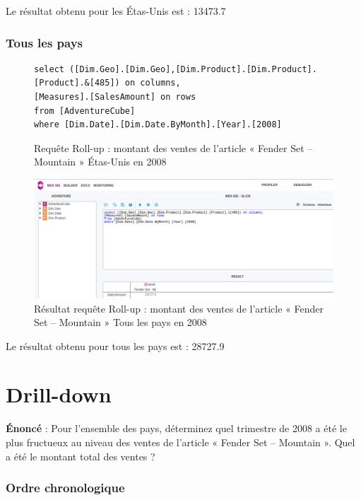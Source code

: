 Le résultat obtenu pour les Étas-Unis est : 13473.7

\subsubsection*{Tous les pays}

\begin{figure}[H]
\centering
\begin{lstlisting}
select ([Dim.Geo].[Dim.Geo],[Dim.Product].[Dim.Product].[Product].&[485]) on columns,
[Measures].[SalesAmount] on rows
from [AdventureCube]
where [Dim.Date].[Dim.Date.ByMonth].[Year].[2008]
\end{lstlisting}
\caption{Requête Roll-up : montant des ventes de l'article « Fender Set – Mountain » Étas-Unis en 2008}
\label{lst:reqRollUpUS}
\end{figure}

\begin{figure}[H]
    \centering
    \includegraphics[width=1\linewidth, fbox]{img/requeteRollUpPays.png}
    \caption{Résultat requête Roll-up : montant des ventes de l'article « Fender Set – Mountain » Tous les pays en 2008}
    \label{reqRollUpResultPays}
\end{figure}

Le résultat obtenu pour tous les pays est : 28727.9

\pagebreak

\section{Drill-down}

\textbf{Énoncé} : Pour l’ensemble des pays, déterminez quel trimestre de 2008 a été le plus fructueux au niveau des ventes de l’article « Fender Set – Mountain ». Quel a été le montant total des ventes ?

\subsubsection*{Ordre chronologique}

